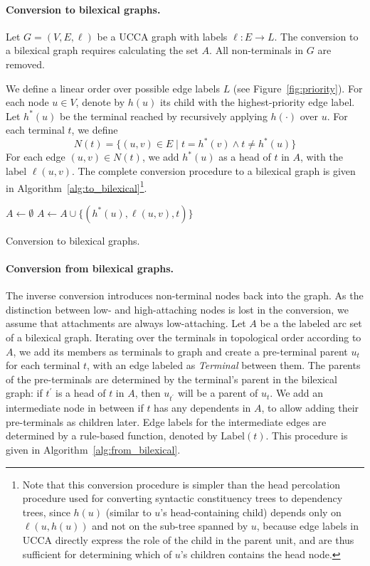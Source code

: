 \documentclass[11pt,a4paper]{article}
\newcommand{\figref}[1]{Figure~\ref{#1}}
\begin{document}
\paragraph{Conversion to bilexical graphs.}
Let $G=(V,E,\ell)$ be a UCCA graph with labels $\ell:E\rightarrow L$.
The conversion to a bilexical graph requires calculating the set $A$.
All non-terminals in $G$ are removed.

We define a linear order over possible edge labels $L$ (see \figref{fig:priority}).
For each node $u \in V$, denote by $h(u)$ its child with the highest-priority edge label.
Let $h^*(u)$ be the terminal reached by recursively applying $h(\cdot)$ over $u$.
For each terminal $t$, we define
\[
N(t) = \{(u,v)\in E \;|\; t=h^*(v) \wedge t \neq h^*(u) \}
\]
For each edge $(u,v)\in N(t)$, we add $h^*(u)$ as a head of $t$ in $A$,
with the label $\ell(u,v)$.
The complete conversion procedure to a bilexical graph is given in
Algorithm~\ref{alg:to_bilexical}\footnote{Note that this conversion procedure
is simpler than the head percolation procedure used for converting syntactic constituency
trees to dependency trees,
since $h(u)$ (similar to $u$'s head-containing child)
depends only on $\ell(u,h(u))$ and not on the sub-tree spanned by $u$,
because edge labels in UCCA directly express the role of the child in the parent unit, and
are thus sufficient for determining which of $u$'s children contains the head node.}.

\begin{algorithm}[ht]
 $A \leftarrow \emptyset$\;
  {
   {
   $A \leftarrow A \cup \{(h^*(u), \ell(u, v), t)\}$\;
  }
 }
 \caption{Conversion to bilexical graphs.}
 \label{alg:to_bilexical}
\end{algorithm}

\paragraph{Conversion from bilexical graphs.}
The inverse conversion introduces non-terminal nodes back into the graph.
As the distinction between low- and high-attaching nodes is lost in the
conversion, we assume that attachments are always
low-attaching.
Let $A$ be a the labeled arc set of a bilexical graph.
Iterating over the terminals in topological order according to $A$,
we add its members as terminals to graph
and create a pre-terminal parent $u_t$ for each terminal $t$,
with an edge labeled as \textit{Terminal} between them.
The parents of the pre-terminals are determined by the terminal's parent in the bilexical
graph: if $t^\prime$ is a head of $t$ in $A$, then $u_{t^\prime}$ will be a parent of $u_t$.
We add an intermediate node in between if $t$ has any dependents in $A$,
to allow adding their pre-terminals as children later.
Edge labels for the intermediate edges are determined by a rule-based function, denoted by
$\mathrm{Label}(t)$.
This procedure is given in Algorithm~\ref{alg:from_bilexical}.
\end{document}
